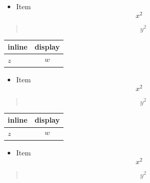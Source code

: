 \begin{itemize}
\item Item
\[
x^2
\]
\end{itemize}

\begin{quote}
\[
y^2
\]
\end{quote}

\par\addvspace{\medskipamount}
\noindent\begin{tabularx}{\linewidth}{@{}>{\raggedright\arraybackslash}X>{\raggedright\arraybackslash}X@{}}
\toprule
inline & display \\
\midrule
$z$ & $$w$$ \\
\bottomrule
\end{tabularx}
\par\addvspace{\medskipamount}
\begin{itemize}
\item Item
\[
x^2
\]
\end{itemize}

\begin{quote}
\[
y^2
\]
\end{quote}

\par\addvspace{\medskipamount}
\noindent\begin{tabularx}{\linewidth}{@{}>{\raggedright\arraybackslash}X>{\raggedright\arraybackslash}X@{}}
\toprule
inline & display \\
\midrule
$z$ & $$w$$ \\
\bottomrule
\end{tabularx}
\par\addvspace{\medskipamount}
\begin{itemize}
\item Item
\[
x^2
\]
\end{itemize}

\begin{quote}
\[
y^2
\]
\end{quote}

